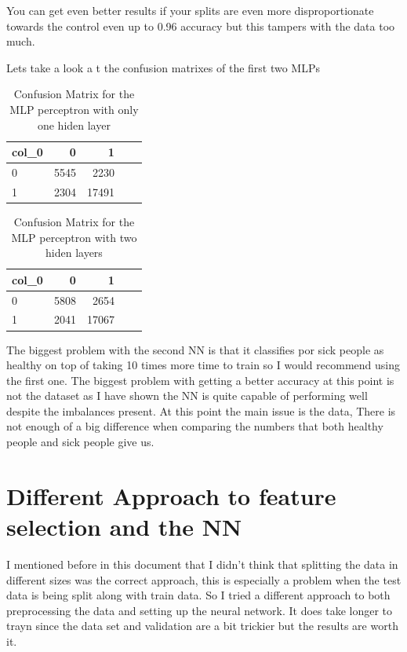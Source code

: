 \documentclass{article} %
\begin{document}
\bigskip
\bigskip
\bigskip
\bigskip
\bigskip
\bigskip
\bigskip
\bigskip

You can get even better results if your splits are even more disproportionate towards the control even up to 0.96 accuracy but this tampers with the data too much.

\bigskip

Lets take a look a t the confusion matrixes of the first two MLPs
\begin{table}[!h]
\centering
\begin{tabular}{lrrrr}
\toprule \hline
col\_0 &   0 &   1 & \\\hline
0     &  5545 &   2230 & \\\hline
1     &   2304 &  17491  \\\hline
\bottomrule \hline
\end{tabular}
\caption{Confusion Matrix for the MLP perceptron with only one hiden layer}
 \label{tab:CG}
\end{table}

\begin{table}[!h]
\centering
\begin{tabular}{lrrrr}
\toprule \hline
col\_0 &   0 &   1 & \\\hline
0     &  5808 &   2654 & \\\hline
1     &   2041 &  17067  \\\hline
\bottomrule \hline
\end{tabular}
\caption{Confusion Matrix for the MLP perceptron with two hiden layers}
 \label{tab:CG}
\end{table}
\bigskip
\bigskip
\bigskip
\bigskip
\bigskip
\bigskip


The biggest problem with the second NN is that it classifies por sick people as healthy on top of taking 10 times more time to train so I would recommend using the first one. The biggest problem with getting a better accuracy at this point is not the dataset as I have shown the NN is quite capable of performing well despite the imbalances present. At this point the main issue is the data, There is not enough of a big difference when comparing the numbers that both healthy people and sick people give us.
\bigskip


\bigskip
\section{Different Approach to feature selection and the NN}

I mentioned before in this document that I didn't think that splitting the data in different sizes was the correct approach, this is especially a problem when the test data is being split along with train data. So I tried a different approach to both preprocessing the data and setting up the neural network. It does take longer to trayn since the data set and validation are a bit trickier but the results are worth it.
\end{document}
